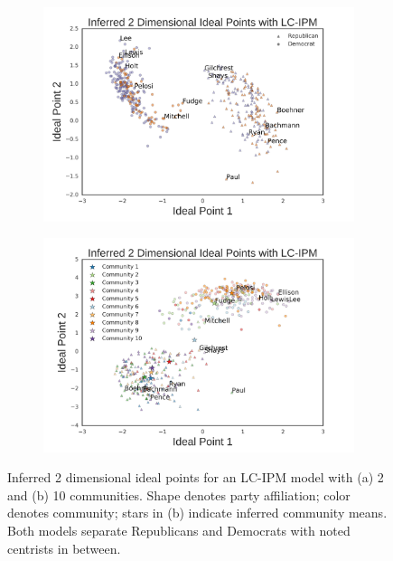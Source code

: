 \documentclass{article}
\begin{document}
\begin{figure}[h]
  \centering
          \begin{subfigure}[b]{0.45\textwidth}
        \includegraphics[width=\textwidth]{ideal_points_congress_2.png}
        \caption{}
        \label{ip_cong_2}
    \end{subfigure}
          \begin{subfigure}[b]{0.45\textwidth}
        \includegraphics[width=\textwidth]{ideal_points_congress_10.png}
        \caption{}
        \label{ip_cong_10}
    \end{subfigure}

  \caption{Inferred 2 dimensional ideal points for an LC-IPM model with (a) 2 and (b) 10 communities. Shape denotes party affiliation; color denotes community; stars in (b) indicate inferred community means. Both models separate Republicans and Democrats with noted centrists in between.}
      \label{fig:lcipm_ip}
\end{figure}
\end{document}
